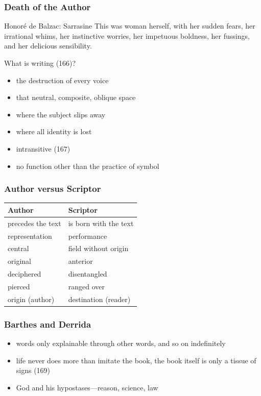 \documentclass[xcolor=dvipsnames]{beamer}
\begin{document}
\begin{frame}
  \frametitle{Death of the Author}
  \begin{block}{Honor{\'e} de Balzac: Sarrasine}
    This was woman herself, with her sudden fears, her irrational
    whims, her instinctive worries, her impetuous boldness, her
    fussings, and her delicious sensibility.
  \end{block}
  What is writing (166)?
  \begin{itemize}
  \item the destruction of every voice
  \item that neutral, composite, oblique space
  \item where the subject slips away
  \item where all identity is lost
  \item intransitive (167)
  \item no function other than the practice of symbol
  \end{itemize}
\end{frame}

\begin{frame}
  \frametitle{Author versus Scriptor}
  \begin{tabular}{|l|l|}\hline
    \textbf{Author}   & \textbf{Scriptor}     \\ \hline 
    precedes the text & is born with the text \\ \hline
    representation    & performance           \\ \hline
    central           & field without origin  \\ \hline
    original          & anterior              \\ \hline
deciphered            & disentangled          \\ \hline
pierced               & ranged over           \\ \hline
origin (author)       & destination (reader)  \\ \hline
  \end{tabular}
\end{frame}

\begin{frame}
  \frametitle{Barthes and Derrida}
  \begin{itemize}
  \item words only explainable through other words, and so on
    indefinitely
  \item life never does more than imitate the book, the book itself is
    only a tissue of signs (169)
  \item God and his hypostases---reason, science, law
  \end{itemize}
\end{frame}
\end{document}
